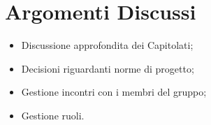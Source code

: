 \section{Argomenti Discussi}
	\begin{itemize}
		\item Discussione approfondita dei {Capitolati\glos};
		\item Decisioni riguardanti norme di progetto;
		\item Gestione incontri con i membri del gruppo;
		\item Gestione ruoli.
	\end{itemize}